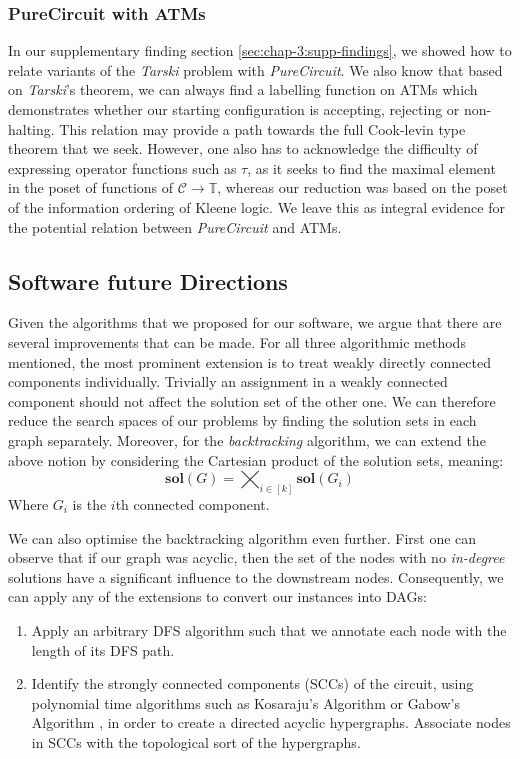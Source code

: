 \subsubsection{PureCircuit with ATMs}
\label{sub-sub-sec:fw:pc-atms}

In our supplementary finding section \ref{sec:chap-3:supp-findings},
we showed how to relate variants of the \textit{Tarski} problem
with \textit{PureCircuit}. We also know that based on
\textit{Tarski}'s theorem, we can always find a labelling function
on ATMs which demonstrates whether our starting configuration is accepting, rejecting or non-halting.
This relation may provide a path towards the full Cook-levin type theorem
that we seek. However, one also has to acknowledge the difficulty of expressing
operator functions such as $\tau$, as it seeks
to find the maximal element in the poset of functions of $\mathcal{C} \to \mathbb{T}$,
whereas our reduction was based on the poset of the information ordering of Kleene logic. We leave this as integral evidence
for the potential relation between \textit{PureCircuit} and ATMs.


\subsection{Software future Directions}

Given the algorithms that we proposed for our software, we argue that there are several improvements
that can be made.
For all three algorithmic methods mentioned, the most prominent extension
is to treat weakly directly connected components individually. Trivially an assignment in a
weakly connected component should not affect the solution set of the other one.
We can therefore reduce the search spaces of our problems by finding
the solution sets in each graph separately. Moreover, for the
\textit{backtracking} algorithm, we can extend the above notion by considering
the Cartesian product of the solution sets, meaning:
$$
    \textbf{sol}(G) = \bigtimes_{i \in [k]}  \textbf{sol}(G_i)
$$
Where $G_i$ is the $i$th connected component.

We can also optimise the backtracking algorithm even further.
First one can observe that if our graph was acyclic, then
the set of the nodes with no \textit{in-degree} solutions have a significant
influence to the downstream nodes. Consequently, we can apply any of the 
extensions to convert our instances into DAGs:
\begin{enumerate}
    \item Apply an arbitrary DFS algorithm such that we annotate each node with the length of its DFS path.
    \item Identify the strongly connected components (SCCs) of the circuit, using polynomial
          time algorithms such as Kosaraju's Algorithm \cite{sharir_StrongconnectivityAlgorithmIts_1981} 
          or Gabow's Algorithm \cite{gabow_PathbasedDepthfirstSearch_2000}, in order
          to create a directed acyclic hypergraphs. Associate nodes in SCCs
          with the topological sort of the hypergraphs. 
\end{enumerate}

